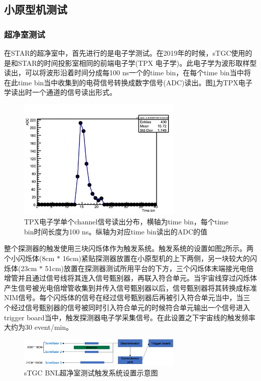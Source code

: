 \subsection{小原型机测试}

\subsubsection{超净室测试}

在STAR的超净室中，首先进行的是电子学测试。在2019年的时候，sTGC使用的是和STAR的时间投影室相同的前端电子学(TPX 电子学)。此电子学为波形取样型读出，可以将波形沿着时间分成每100 ns一个的time bin，在每个time bin当中将在此time bin当中收集到的电荷信号转换成数字信号(ADC)读出。图\ref{fig:TPXChannel}为TPX电子学读出时一个通道的信号读出形式。
\begin{figure}[htb]
    \begin{center}
    \includegraphics[width=0.7\textwidth,clip]{figures/Chapter3/TPXChannel.png}
    \end{center}
    \caption[TPX电子学单个channel信号读出分布]{TPX电子学单个channel信号读出分布，横轴为time bin，每个time bin时间长度为100 ns。纵轴为对应time bin读出的ADC的值}
    \label{fig:TPXChannel}
\end{figure}
整个探测器的触发使用三块闪烁体作为触发系统。触发系统的设置如图\ref{fig:sTGC_Trigger_CR}所示。两个小闪烁体(8cm $*$ 16cm)紧贴探测器放置在小原型机的上下两侧，另一块较大的闪烁体(23cm $*$ 51cm)放置在探测器测试所用平台的下方，三个闪烁体末端接光电倍增管并且通过信号线将其连入信号甄别器，再联入符合单元。当宇宙线穿过闪烁体产生信号被光电倍增管收集到并传入信号甄别器以后，信号甄别器将其转换成标准NIM信号。每个闪烁体的信号在经过信号甄别器后再被引入符合单元当中，当三个经过信号甄别器的信号被同时引入符合单元的时候符合单元输出一个信号进入trigger board当中，触发探测器电子学采集信号。在此设置之下宇宙线的触发频率大约为30 event/min。
\begin{figure}[htb]
    \begin{center}
    \includegraphics[width=0.7\textwidth,clip]{figures/Chapter3/TiggerCarton.png}
    \end{center}
    \caption[sTGC BNL超净室测试触发系统设置示意图]{sTGC BNL超净室测试触发系统设置示意图}
    \label{fig:sTGC_Trigger_CR}
\end{figure}


